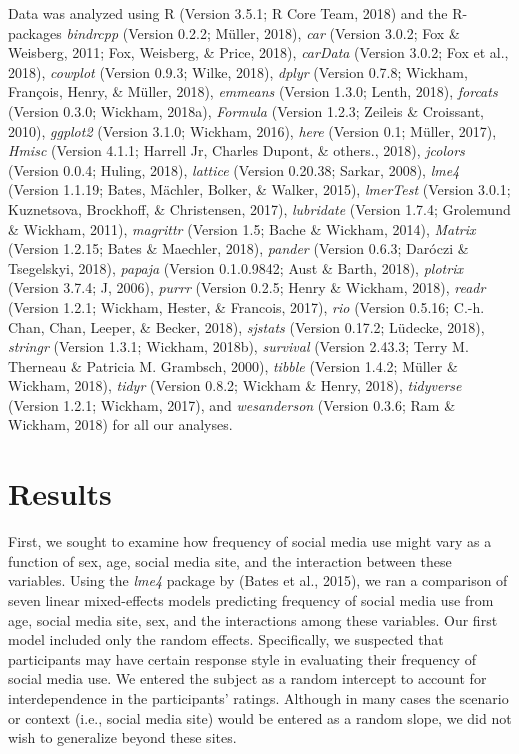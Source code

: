 \documentclass[man, fleqn, noextraspace]{apa6}
\theoremstyle{definition}
\theoremstyle{definition}
\theoremstyle{definition}
\theoremstyle{remark}
\begin{document}
Data was analyzed using R (Version 3.5.1; R Core Team, 2018) and the
R-packages \emph{bindrcpp} (Version 0.2.2; Müller, 2018), \emph{car}
(Version 3.0.2; Fox \& Weisberg, 2011; Fox, Weisberg, \& Price, 2018),
\emph{carData} (Version 3.0.2; Fox et al., 2018), \emph{cowplot}
(Version 0.9.3; Wilke, 2018), \emph{dplyr} (Version 0.7.8; Wickham,
François, Henry, \& Müller, 2018), \emph{emmeans} (Version 1.3.0; Lenth,
2018), \emph{forcats} (Version 0.3.0; Wickham, 2018a), \emph{Formula}
(Version 1.2.3; Zeileis \& Croissant, 2010), \emph{ggplot2} (Version
3.1.0; Wickham, 2016), \emph{here} (Version 0.1; Müller, 2017),
\emph{Hmisc} (Version 4.1.1; Harrell Jr, Charles Dupont, \& others.,
2018), \emph{jcolors} (Version 0.0.4; Huling, 2018), \emph{lattice}
(Version 0.20.38; Sarkar, 2008), \emph{lme4} (Version 1.1.19; Bates,
Mächler, Bolker, \& Walker, 2015), \emph{lmerTest} (Version 3.0.1;
Kuznetsova, Brockhoff, \& Christensen, 2017), \emph{lubridate} (Version
1.7.4; Grolemund \& Wickham, 2011), \emph{magrittr} (Version 1.5; Bache
\& Wickham, 2014), \emph{Matrix} (Version 1.2.15; Bates \& Maechler,
2018), \emph{pander} (Version 0.6.3; Daróczi \& Tsegelskyi, 2018),
\emph{papaja} (Version 0.1.0.9842; Aust \& Barth, 2018), \emph{plotrix}
(Version 3.7.4; J, 2006), \emph{purrr} (Version 0.2.5; Henry \& Wickham,
2018), \emph{readr} (Version 1.2.1; Wickham, Hester, \& Francois, 2017),
\emph{rio} (Version 0.5.16; C.-h. Chan, Chan, Leeper, \& Becker, 2018),
\emph{sjstats} (Version 0.17.2; Lüdecke, 2018), \emph{stringr} (Version
1.3.1; Wickham, 2018b), \emph{survival} (Version 2.43.3; Terry M.
Therneau \& Patricia M. Grambsch, 2000), \emph{tibble} (Version 1.4.2;
Müller \& Wickham, 2018), \emph{tidyr} (Version 0.8.2; Wickham \& Henry,
2018), \emph{tidyverse} (Version 1.2.1; Wickham, 2017), and
\emph{wesanderson} (Version 0.3.6; Ram \& Wickham, 2018) for all our
analyses.

\section{Results}\label{results}

First, we sought to examine how frequency of social media use might vary
as a function of sex, age, social media site, and the interaction
between these variables. Using the \emph{lme4} package by (Bates et al.,
2015), we ran a comparison of seven linear mixed-effects models
predicting frequency of social media use from age, social media site,
sex, and the interactions among these variables. Our first model
included only the random effects. Specifically, we suspected that
participants may have certain response style in evaluating their
frequency of social media use. We entered the subject as a random
intercept to account for interdependence in the participants' ratings.
Although in many cases the scenario or context (i.e., social media site)
would be entered as a random slope, we did not wish to generalize beyond
these sites.
\end{document}
